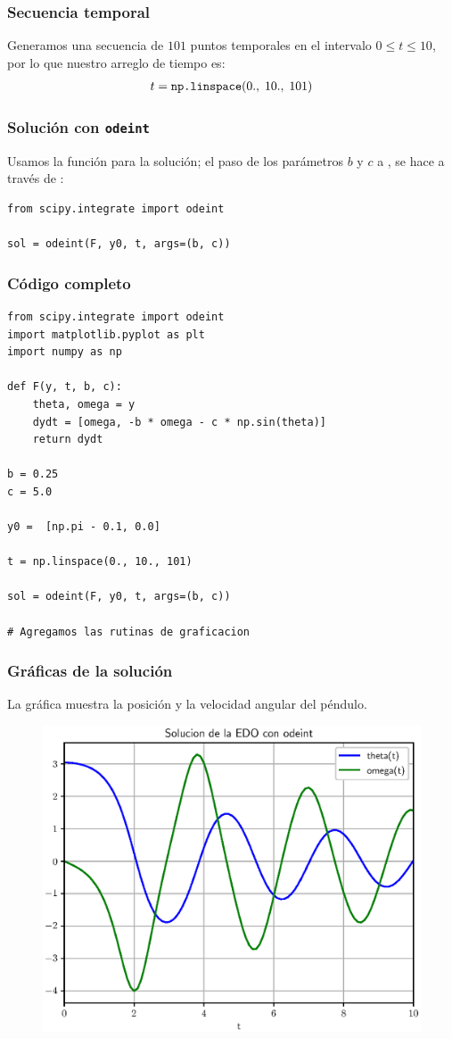 \documentclass[12pt]{beamer}
\begin{document}
\begin{frame}
\frametitle{Secuencia temporal}
Generamos una secuencia de $101$ puntos temporales en el intervalo $0 \leq t \leq 10$, por lo que nuestro arreglo de tiempo es:
\pause
\begin{align*}
t =  \mbox{\texttt{np.linspace}}(0., \; 10., \; 101)
\end{align*}
\end{frame}
\begin{frame}[fragile]
\frametitle{Solución con \texttt{odeint}}
Usamos la función  para la solución; el paso de los parámetros $b$ y $c$ a , se hace a través de :
\pause
\begin{lstlisting}[caption=Solución con odeint]
from scipy.integrate import odeint

sol = odeint(F, y0, t, args=(b, c))
\end{lstlisting}
\end{frame}
\begin{frame}
\frametitle{Código completo}
\begin{lstlisting}[caption=Función con las EDO1 a integrar]
from scipy.integrate import odeint
import matplotlib.pyplot as plt
import numpy as np

def F(y, t, b, c):
    theta, omega = y
    dydt = [omega, -b * omega - c * np.sin(theta)]
    return dydt

b = 0.25
c = 5.0

y0 =  [np.pi - 0.1, 0.0]

t = np.linspace(0., 10., 101)

sol = odeint(F, y0, t, args=(b, c))

# Agregamos las rutinas de graficacion
\end{lstlisting}
\end{frame}
\begin{frame}[plain]
\frametitle{Gráficas de la solución}
La gráfica muestra la posición y la velocidad angular del péndulo.
\begin{figure}
    \centering
    \includegraphics[scale=0.5]{Imagenes/plot_Ejercicio_odeint_01_Pendulo.eps}
\end{figure}
\end{frame}
\end{document}
